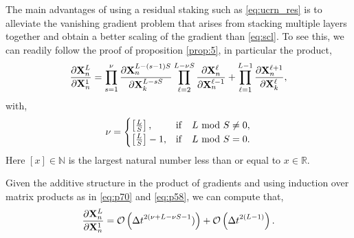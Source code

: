\documentclass{article}
\newcommand{\bX}{{\bf X}}
\newcommand{\ord}{{\mathcal O}}
\newcommand{\R}{{\mathbb R}}
\newcommand{\Dt}{{\Delta t}}
\begin{document}
The main advantages of using a residual staking such as \eqref{eq:ucrn_res} is to alleviate the vanishing gradient problem that arises from stacking multiple layers together and obtain a better scaling of the gradient than \eqref{eq:scl}. To see this, we can readily follow the proof of proposition \ref{prop:5}, in particular the product,
\begin{equation}
    \label{eq:res1}
    \frac{\partial \bX^L_n}{\partial \bX^1_n} = \prod\limits_{s=1}^{\nu} \frac{\partial \bX^{L-(s-1)S}_n}{\partial \bX^{L-sS}_k}\prod\limits_{\ell=2}^{L-\nu S}  \frac{\partial \bX^\ell_n}{\partial \bX^{\ell-1}_n} + \prod\limits_{\ell=1}^{L-1} \frac{\partial \bX^{\ell+1}_n}{\partial \bX^{\ell}_k},
\end{equation}
with,
\begin{equation}
\label{eq:nu}
    \nu = \begin{cases}
    \left[ \frac{L}{S}\right], &{\rm if}\quad L\ {\rm mod}\ S \neq 0, \\
    \left[ \frac{L}{S}\right]-1, &{\rm if}\quad L\ {\rm mod}\ S = 0.
    \end{cases}
\end{equation}
Here $[x] \in {\mathbb N}$ is the largest natural number less than or equal to $x \in \R$.

Given the additive structure in the product of gradients and using induction over matrix products as in \eqref{eq:p70} and \eqref{eq:p58}, we can compute that,
\begin{equation}
    \label{eq:res2}
    \frac{\partial \bX^L_n}{\partial \bX^1_n} = \ord\left(\Dt^{2(\nu+L-\nu S-1})\right) + \ord\left(\Dt^{2(L-1)}\right).
    \end{equation}
    
\end{document}
